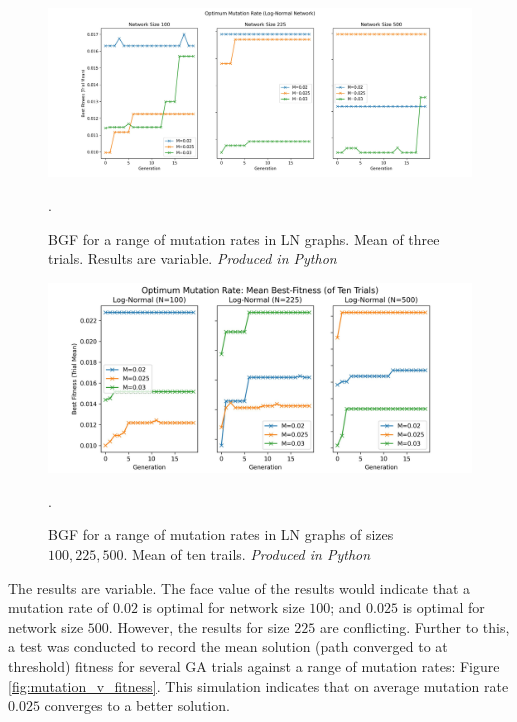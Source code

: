 \documentclass[
	a4paper, %
	10pt, %
	unnumberedsections, %
	twoside, %
]{LTJournalArticle}
\begin{document}
\begin{figure}
	\includegraphics[width=\linewidth]{Figures/sims/mutation/optimum.jpg}
	\caption{BGF for a range of mutation rates in LN graphs. Mean of three trials. Results are variable. \emph{Produced in Python}}. 
	\label{fig:mutation_opt}
\end{figure}

\begin{figure}
	\includegraphics[width=\linewidth]{Figures/sims/mutation/optimum_ten.jpg}
	\caption{BGF for a range of mutation rates in LN graphs of sizes \(100, 225, 500\). Mean of ten trails.  \emph{Produced in Python}}. 
	\label{fig:mutation_opt_2}
\end{figure}

The results are variable. The face value of the results would indicate that a mutation rate of \(0.02\) is optimal for network size \(100\); and \(0.025\) is optimal for network size \(500\). However, the results for size \(225\) are conflicting. Further to this, a test was conducted to record the mean solution (path converged to at threshold) fitness for several GA trials against a range of mutation rates: Figure \ref{fig:mutation_v_fitness}. This simulation indicates that on average mutation rate \(0.025\) converges to a better solution. 
\end{document}
